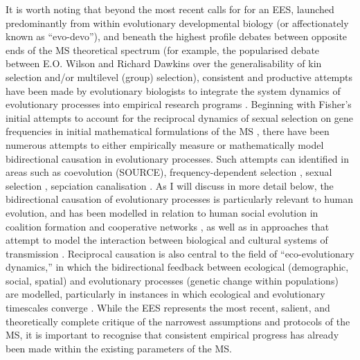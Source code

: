 
It is worth noting that beyond the most recent calls for for an EES, launched predominantly from within evolutionary developmental biology (or affectionately known as ``evo-devo''), and beneath the highest profile debates between opposite ends of the MS theoretical spectrum (for example, the popularised debate between E.O. Wilson and Richard Dawkins over the generalisability of kin selection and/or multilevel (group) selection), consistent and productive attempts have been made by evolutionary biologists to integrate the system dynamics of evolutionary processes into empirical research programs \citep{Wray2014,Svensson2017}. Beginning with Fisher's initial attempts to account for the reciprocal dynamics of sexual selection on gene frequencies in initial mathematical formulations of the MS \citep{Fisher1930}, there have been numerous attempts to either empirically measure or mathematically model bidirectional causation in evolutionary processes.  Such attempts can identified in areas such as coevolution (SOURCE), frequency-dependent selection \citep{Prum2010}, sexual selection \citep{Svensson2009}, sepciation \citep{Mayr1965} canalisation \citep{Waddington1950}.  As I will discuss in more detail below, the bidirectional causation of evolutionary processes is particularly relevant to human evolution, and has been modelled in relation to human social evolution in coalition formation and cooperative networks \citep{Gavrilets2008}, as well as in approaches that attempt to model the interaction between biological and cultural systems of transmission \citep{Cavalli-Sforza1981,Boyd1988,Henrich2007,Claidiere2007}.  Reciprocal causation is also central to the field of ``eco-evolutionary dynamics,'' in which the bidirectional feedback between ecological (demographic, social, spatial) and evolutionary processes (genetic change within populations) are modelled, particularly in instances in which ecological and evolutionary timescales converge \citep{Hendry2017}.  While the EES represents the most recent, salient, and theoretically complete critique of the narrowest assumptions and protocols of the MS, it is important to recognise that consistent empirical progress has already been made within the existing parameters of the MS.

